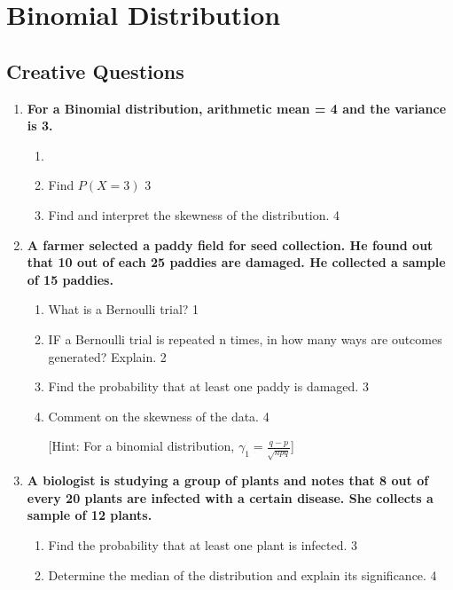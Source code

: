 \documentclass[a4paper,oneside, margin=1.4in]{book}
\begin{document}
\chapter{Binomial Distribution} 
\section{Creative Questions}
  \begin{enumerate}
  
   \item
	  \textbf{For a Binomial distribution, arithmetic mean = 4 and the variance is 3.} 
  
  \begin{enumerate}
    \item
    \item  
	Find $P(X = 3)$ \hfill 3
    \item
	Find and interpret the skewness of the distribution. \hfill 4
  \end{enumerate}
  
     \item
	  \textbf{A farmer selected a paddy field for seed collection. He found out that 10 out of each 25 paddies are damaged. He collected a sample of 15 paddies.} 
  
  \begin{enumerate}
    \item
	What is a Bernoulli trial? \hfill 1
    \item
	IF a Bernoulli trial is repeated n times, in how many ways are outcomes 
	generated? Explain. \hfill 2
    \item  
	Find the probability that at least one paddy is damaged. \hfill 3
    \item
	Comment on the skewness of the data. \hfill 4 
	
		[Hint: For a binomial distribution, $\gamma_1 = \frac{q-p}{\sqrt{npq}}$]
  \end{enumerate}
  
  \item
	  \textbf{A biologist is studying a group of plants and notes that 8 out of every 20 plants are infected with a certain disease. She collects a sample of 12 plants.} 
  
  \begin{enumerate}
    \item  
	Find the probability that at least one plant is infected. \hfill 3
    \item
	Determine the median of the distribution and explain its significance. \hfill 4
  \end{enumerate}



\end{enumerate}
\end{document}
